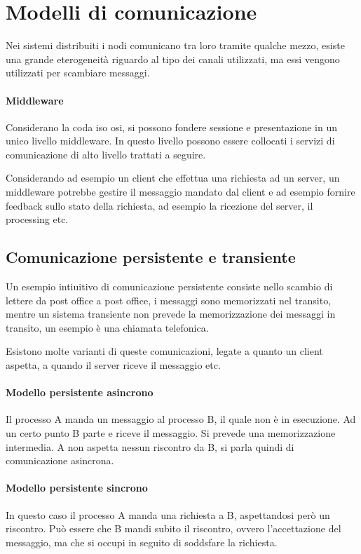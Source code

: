 \section{Modelli di comunicazione}
Nei sistemi distribuiti i nodi comunicano tra loro tramite qualche
mezzo, esiste una grande eterogeneità riguardo al tipo dei canali utilizzati, 
ma essi vengono utilizzati per scambiare messaggi.

\paragraph{Middleware}
Considerano la coda iso osi, si possono fondere sessione e presentazione 
in un unico livello middleware. In questo livello possono essere collocati i 
servizi di comunicazione di alto livello trattati a seguire.

Considerando ad esempio un client che effettua una richiesta ad un 
server, un middleware potrebbe gestire il messaggio mandato 
dal client e ad esempio fornire feedback sullo stato della richiesta, 
ad esempio la ricezione del server, il processing etc.
\subsection{Comunicazione persistente e transiente}
Un esempio intiuitivo di comunicazione persistente consiste nello scambio 
di lettere da post office a post office, i messaggi sono 
memorizzati nel transito, mentre un sistema transiente non 
prevede la memorizzazione dei messaggi in transito, un esempio è una chiamata 
telefonica.

Esistono molte varianti di queste comunicazioni, legate a quanto 
un client aspetta, a quando il server riceve il messaggio etc.

\paragraph{Modello persistente asincrono}
Il processo A manda un messaggio al processo B, il quale non è in esecuzione.
Ad un certo punto B parte e riceve il messaggio. Si prevede una memorizzazione 
intermedia. A non aspetta nessun riscontro da B, si parla quindi di comunicazione 
asincrona.

\paragraph{Modello persistente sincrono}
In questo caso il processo A manda una richiesta a B, aspettandosi però 
un riscontro.
Può essere che B mandi subito il riscontro, ovvero l'accettazione del messaggio, 
ma che si occupi in seguito di soddsfare la richiesta.

